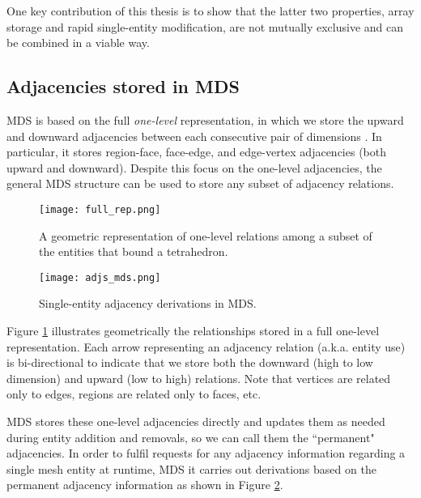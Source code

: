 One key contribution of this thesis is to show that the latter two properties,
array storage and rapid single-entity modification, are not mutually exclusive
and can be combined in a viable way.

\subsection{Adjacencies stored in MDS}
\label{sec:mds_adj}

MDS is based on the full {\it one-level} representation,
in which we store the upward
and downward adjacencies between each consecutive
pair of dimensions \cite{beall1997general}.
In particular, it stores
region-face, face-edge, and edge-vertex adjacencies
(both upward and downward).
Despite this focus on the one-level adjacencies, the general MDS
structure can be used to store any subset of
adjacency relations.

\begin{figure}
\begin{center}
\texttt{[image: full\_rep.png]}
\caption{A geometric representation of one-level
relations among a subset of the entities that bound a tetrahedron.}
\label{fig:mds_topo}
\end{center}
\end{figure}

\begin{figure}
\begin{center}
\texttt{[image: adjs\_mds.png]}
\caption{Single-entity adjacency derivations in MDS.}
\label{fig:adjs_mds}
\end{center}
\end{figure}

Figure \ref{fig:mds_topo} illustrates geometrically the relationships
stored in a full one-level representation.
Each arrow representing an adjacency relation (a.k.a. entity use)
is bi-directional to indicate that we store both the
downward (high to low dimension) and upward (low to high) relations.
Note that vertices are related only to edges,
regions are related only to faces, etc.

MDS stores these one-level adjacencies directly
and updates them as needed during entity addition and removals,
so we can call them the ``permanent" adjacencies.
In order to fulfil requests for any adjacency information regarding a single
mesh entity at runtime,
MDS it carries out derivations based on the permanent adjacency information
as shown in Figure \ref{fig:adjs_mds}.

